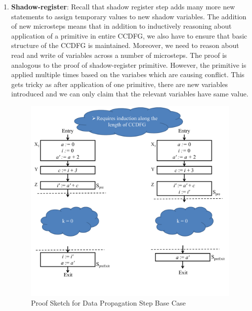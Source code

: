 \begin{enumerate}
The second step involves moving the microstep into the previous iteration. 
It requies removing the microstep, referred as $mstep$ from beginning of $S_{loop}$ and adding it to end of $S_{loop}$. 
Also, $mstep$ is added in $S_{pre}$ and removed 
from $S_{preExit}$. The proof of this step requires non-trivial induction as explained in Figures~\ref{fig:proof-after-data-propagation-basecase} and ~\ref{fig:proof-after-inductive-step}. 
These stages need to be
repeated for as many variables as are in conflict. 

\item \textbf{Shadow-register}: Recall that shadow register step adds many more new statements to assign temporary values to 
new shadow variables. The addition of new microsteps means that in addition to inductively reasoning about application of a primitive in entire CCDFG, we also have to ensure that basic structure of the CCDFG is maintained. Moreover, we need to reason about read and write of 
variables across a number of microsteps. The proof is analogous to the proof of shadow-register primitive. However, the primitive is applied multiple times based on the variabes which are causing conflict. This gets tricky as after application of one primitive, there are new variables introduced and we can only claim that the relevant variables have same value.

\begin{figure}[t!]
\begin{center}
\includegraphics[width=5.5in]{fig-proposal/proof-after-data-propagation-basecase}
\end{center}
\caption{Proof Sketch for Data Propagation Step Base Case}
\label{fig:proof-after-data-propagation-basecase}
\end{figure}


\end{enumerate}
